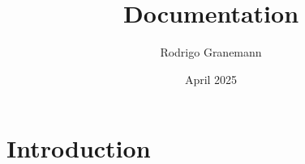 \documentclass{article}
\title{Documentation}
\author{Rodrigo Granemann}
\date{April 2025}
\begin{document}
\maketitle

\section{Introduction}
\end{document}
